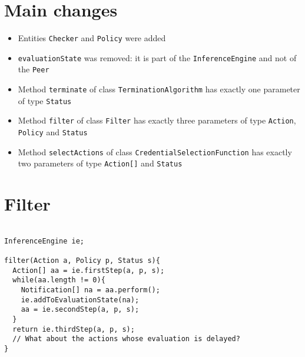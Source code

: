 \documentclass{article}
\begin{document}
\section*{Main changes}

\begin{itemize}
\item Entities \texttt{Checker} and \texttt{Policy} were added
\item \texttt{evaluationState} was removed: it is part of the \texttt{InferenceEngine} and not of the \texttt{Peer}
\item Method \texttt{terminate} of class \texttt{TerminationAlgorithm} has exactly one parameter of type \texttt{Status}
\item Method \texttt{filter} of class \texttt{Filter} has exactly three parameters of type \texttt{Action}, \texttt{Policy} and \texttt{Status}
\item Method \texttt{selectActions} of class \texttt{CredentialSelectionFunction} has exactly two parameters of type \texttt{Action[]} and \texttt{Status}
\end{itemize}

\section{Filter}

\begin{verbatim}

InferenceEngine ie;

filter(Action a, Policy p, Status s){
  Action[] aa = ie.firstStep(a, p, s);
  while(aa.length != 0){
    Notification[] na = aa.perform();
    ie.addToEvaluationState(na);
    aa = ie.secondStep(a, p, s);
  }
  return ie.thirdStep(a, p, s);
  // What about the actions whose evaluation is delayed?
}

\end{verbatim}
\end{document}
